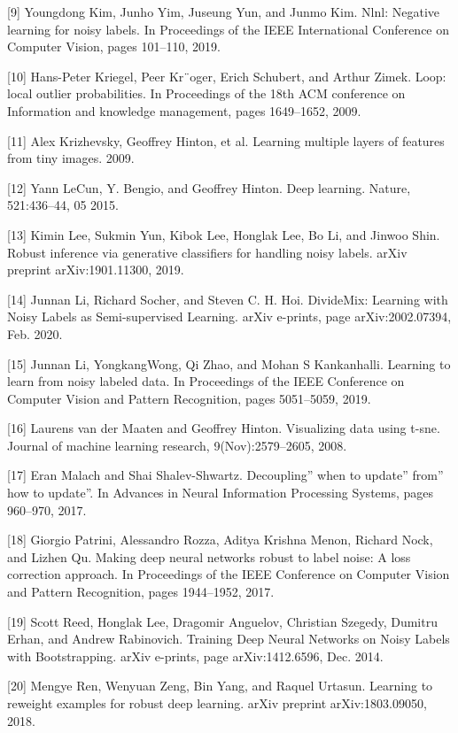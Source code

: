 \documentclass[11pt]{article}
\begin{document}
[9] Youngdong Kim, Junho Yim, Juseung Yun, and Junmo Kim.
Nlnl: Negative learning for noisy labels. In Proceedings
of the IEEE International Conference on Computer Vision,
pages 101–110, 2019.

[10] Hans-Peter Kriegel, Peer Kr¨oger, Erich Schubert, and Arthur
Zimek. Loop: local outlier probabilities. In Proceedings
of the 18th ACM conference on Information and knowledge
management, pages 1649–1652, 2009.

[11] Alex Krizhevsky, Geoffrey Hinton, et al. Learning multiple
layers of features from tiny images. 2009.

[12] Yann LeCun, Y. Bengio, and Geoffrey Hinton. Deep learning.
Nature, 521:436–44, 05 2015.

[13] Kimin Lee, Sukmin Yun, Kibok Lee, Honglak Lee, Bo Li,
and Jinwoo Shin. Robust inference via generative classifiers
for handling noisy labels. arXiv preprint arXiv:1901.11300,
2019.

[14] Junnan Li, Richard Socher, and Steven C. H. Hoi. DivideMix:
Learning with Noisy Labels as Semi-supervised
Learning. arXiv e-prints, page arXiv:2002.07394, Feb. 2020.

[15] Junnan Li, YongkangWong, Qi Zhao, and Mohan S Kankanhalli.
Learning to learn from noisy labeled data. In Proceedings
of the IEEE Conference on Computer Vision and Pattern
Recognition, pages 5051–5059, 2019.

[16] Laurens van der Maaten and Geoffrey Hinton. Visualizing
data using t-sne. Journal of machine learning research,
9(Nov):2579–2605, 2008.

[17] Eran Malach and Shai Shalev-Shwartz. Decoupling” when
to update” from” how to update”. In Advances in Neural
Information Processing Systems, pages 960–970, 2017.

[18] Giorgio Patrini, Alessandro Rozza, Aditya Krishna Menon,
Richard Nock, and Lizhen Qu. Making deep neural networks
robust to label noise: A loss correction approach. In Proceedings
of the IEEE Conference on Computer Vision and
Pattern Recognition, pages 1944–1952, 2017.

[19] Scott Reed, Honglak Lee, Dragomir Anguelov, Christian
Szegedy, Dumitru Erhan, and Andrew Rabinovich. Training
Deep Neural Networks on Noisy Labels with Bootstrapping.
arXiv e-prints, page arXiv:1412.6596, Dec. 2014.

[20] Mengye Ren, Wenyuan Zeng, Bin Yang, and Raquel Urtasun.
Learning to reweight examples for robust deep learning.
arXiv preprint arXiv:1803.09050, 2018.
\end{document}
